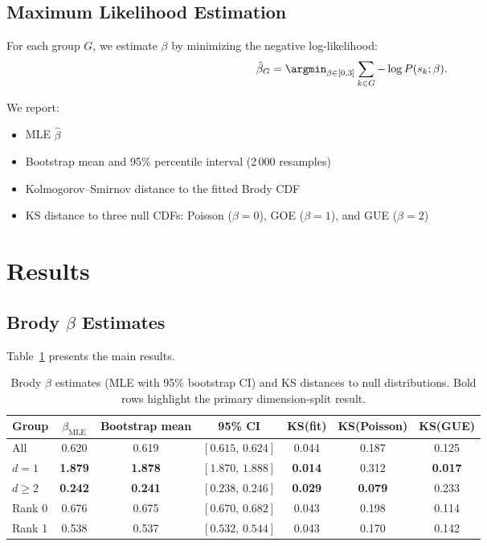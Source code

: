 \documentclass[11pt]{article}
\begin{document}
\subsection{Maximum Likelihood Estimation}

For each group $G$, we estimate $\beta$ by minimizing the negative
log-likelihood:
\begin{equation}
\hat\beta_G = \argmin_{\beta\in[0,3]} \sum_{k\in G}
-\log P(s_k;\beta).
\end{equation}

We report:
\begin{itemize}
  \item MLE $\hat\beta$
  \item Bootstrap mean and 95\% percentile interval (2\,000 resamples)
  \item Kolmogorov--Smirnov distance to the fitted Brody CDF
  \item KS distance to three null CDFs: Poisson ($\beta=0$),
    GOE ($\beta=1$), and GUE ($\beta=2$)
\end{itemize}

\section{Results}
\label{sec:results}

\subsection{Brody $\beta$ Estimates}

Table~\ref{tab:brody} presents the main results.

\begin{table}[ht]
\centering
\caption{Brody $\beta$ estimates (MLE with 95\% bootstrap CI) and KS
distances to null distributions.  Bold rows highlight the primary
dimension-split result.}
\label{tab:brody}
\begin{tabular}{lcccccc}
\toprule
Group & $\beta_\text{MLE}$ & Bootstrap mean & 95\% CI & KS(fit) & KS(Poisson) & KS(GUE) \\
\midrule
All      & 0.620 & 0.619 & $[0.615,\,0.624]$ & 0.044 & 0.187 & 0.125 \\
\midrule
\textbf{$d=1$} &
  \textbf{1.879} & \textbf{1.878} &
  \textbf{$[1.870,\,1.888]$} & \textbf{0.014} & 0.312 &
  \textbf{0.017} \\
\textbf{$d\ge2$} &
  \textbf{0.242} & \textbf{0.241} &
  \textbf{$[0.238,\,0.246]$} & \textbf{0.029} & \textbf{0.079} &
  0.233 \\
\midrule
Rank 0 & 0.676 & 0.675 & $[0.670,\,0.682]$ & 0.043 & 0.198 & 0.114 \\
Rank 1 & 0.538 & 0.537 & $[0.532,\,0.544]$ & 0.043 & 0.170 & 0.142 \\
\bottomrule
\end{tabular}
\end{table}
\end{document}
